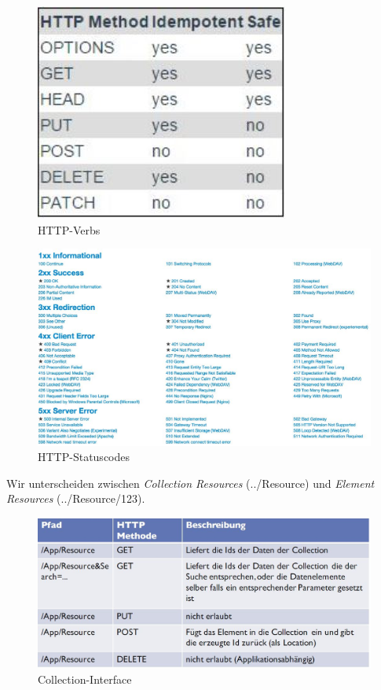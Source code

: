 \begin{figure}[h!]
\centering
\includegraphics[width=0.5\linewidth]{fig/http-verbs}
\caption{HTTP-Verbs}
\label{fig:http-verbs}
\end{figure}

\begin{figure}[h!]
\centering
\includegraphics[width=1\linewidth]{fig/http-statuscodes}
\caption{HTTP-Statuscodes}
\label{fig:http-statuscodes}
\end{figure}

\newpage

Wir unterscheiden zwischen \emph{Collection Resources} (../Resource)  und \emph{Element Resources} (../Resource/123).

\begin{figure}[h!]
\centering
\includegraphics[width=0.7\linewidth]{fig/rest-collection-interface}
\caption{Collection-Interface}
\label{fig:rest-collection-interface}
\end{figure}

